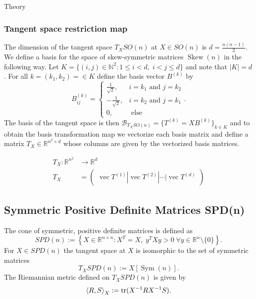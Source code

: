 \begin{chapter}{Theory}
\subsubsection{Tangent space restriction map} %
\label{ssub:TangentSO}
The dimension of the tangent space $T_XSO(n)$ at $X\in SO(n)$ is $d=\frac{n(n-1)}{2}$. We define a basis for the space of skew-symmetric matrices $\operatorname{Skew}(n)$ in the following
way. Let $K = \lbrace (i,j)\in\mathbb{N}^2: 1\leq i < d,\; i < j \leq d  \rbrace$ and note that $|K|=d$. For all $k=(k_1,k_2)=\in K$ define the basis vector $B^{(k)}$ by 
\begin{equation}
    B^{(k)}_{ij}=\begin{cases}
	\frac{1}{\sqrt{2}}, & i=k_1 \text{ and } j=k_2\\
	-\frac{1}{\sqrt{2}}, & i=k_2 \text{ and } j=k_1\\
	0, & \text{ else }
    \end{cases}.
\end{equation}
The basis of the tangent space is then $\mathcal{B}_{T_XSO(n)}=\lbrace T^{(k)} = XB^{(k)} \rbrace_{k\in K}$ and to obtain the basis transformation map
we vectorize each basis matrix and define a matrix $T_X\in\mathbb{R}^{n^2\times d}$ whose columns are given by the vectorized basis matrices.

\begin{align}
    T_X: \mathbb{R}^{n^2} &\to \mathbb{R}^{d}\\
    T_X&= \begin{pmatrix}
	\operatorname{vec}T^{(1)}|\operatorname{vec}T^{(2)}|\cdots|\operatorname{vec}T^{(d)}
    \end{pmatrix}
\end{align}


\subsection{Symmetric Positive Definite Matrices SPD(n)} %
\label{sub:SPD(N)}
The cone of symmetric, positive definite matrices is defined as
\begin{equation}
    SPD(n):=\left\lbrace X\in\mathbb{R}^{n\times n}:X^T=X,\; y^TXy>0\; \forall y\in\mathbb{R}^n\setminus\lbrace 0\rbrace  \right\rbrace.
\end{equation}
For $X\in SPD(n)$ the tangent space at $X$ is isomorphic to the set of symmetric matrices
\begin{equation}
    T_XSPD(n):=X[\operatorname{Sym}(n)].
\end{equation}
The Riemannian metric defined on $T_XSPD(n)$ is given by
\begin{equation}
    \label{eq:spdmetric}
    \left\langle R,S \right\rangle_X := \operatorname{tr}(X^{-1}RX^{-1}S).
\end{equation}


\end{chapter}
